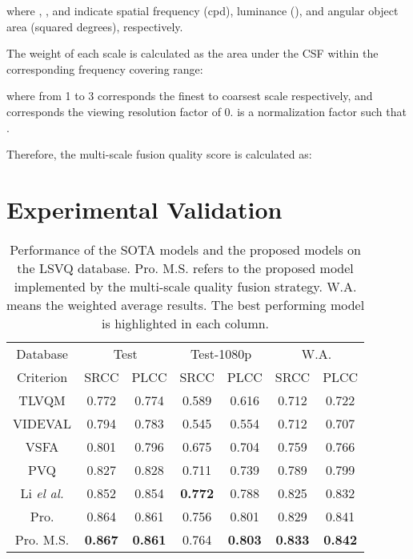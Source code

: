 \documentclass[sigconf]{acmart}
\begin{document}
where , , and  indicate spatial frequency (cpd), luminance (), and angular object area (squared degrees), respectively.

The weight of each scale is calculated as the area under the CSF within the corresponding frequency covering range:

where  from 1 to 3 corresponds the finest to coarsest scale respectively, and  corresponds the viewing resolution factor of 0.  is a normalization factor such that .


Therefore, the multi-scale fusion quality score  is calculated as:



\section{Experimental Validation}




















\begin{table}
\centering
\renewcommand{\arraystretch}{1}
\caption{Performance of the SOTA models and the proposed models on the LSVQ database. Pro. M.S. refers to the proposed model implemented by the multi-scale quality fusion strategy. W.A. means the weighted average results. The best performing model is highlighted in each column.}
\label{performance_lsvq}
\begin{tabular}{c|cc|cc|cc}
\toprule[.15em]
 Database & \multicolumn{2}{c|}{Test} & \multicolumn{2}{c|}{Test-1080p} & \multicolumn{2}{c}{W.A.} \\
  Criterion & SRCC & PLCC & SRCC & PLCC& SRCC & PLCC  \\
\hline
TLVQM & 0.772&0.774& 0.589& 0.616& 0.712 & 0.722 \\
VIDEVAL & 0.794& 0.783& 0.545& 0.554& 0.712 &0.707 \\
VSFA & 0.801& 0.796& 0.675& 0.704 &0.759  &0.766 \\
PVQ & 0.827& 0.828& 0.711& 0.739 & 0.789 &0.799 \\
Li \textit{el al.} & 0.852& 0.854& \textbf{0.772}& 0.788 & 0.825 &0.832 \\
Pro. &  0.864& 0.861&  0.756&  0.801& 0.829 &0.841 \\
Pro. M.S. & \textbf{0.867}  &\textbf{0.861}  & 0.764  & \textbf{0.803}  & \textbf{0.833} & \textbf{0.842}  \\
\bottomrule[.15em]
\end{tabular}
\end{table}
\end{document}
